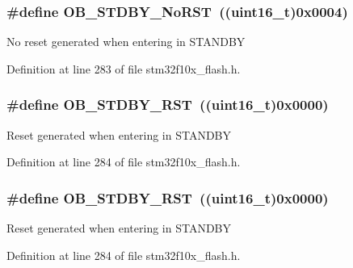 \subsubsection[{\texorpdfstring{O\+B\+\_\+\+S\+T\+D\+B\+Y\+\_\+\+No\+R\+ST}{OB_STDBY_NoRST}}]{\setlength{\rightskip}{0pt plus 5cm}\#define O\+B\+\_\+\+S\+T\+D\+B\+Y\+\_\+\+No\+R\+ST~(({\bf uint16\+\_\+t})0x0004)}\hypertarget{group___option___bytes__n_r_s_t___s_t_d_b_y_ga9588443b20719498422aeb72b65de839}{}\label{group___option___bytes__n_r_s_t___s_t_d_b_y_ga9588443b20719498422aeb72b65de839}
No reset generated when entering in S\+T\+A\+N\+D\+BY 

Definition at line 283 of file stm32f10x\+\_\+flash.\+h.

\subsubsection[{\texorpdfstring{O\+B\+\_\+\+S\+T\+D\+B\+Y\+\_\+\+R\+ST}{OB_STDBY_RST}}]{\setlength{\rightskip}{0pt plus 5cm}\#define O\+B\+\_\+\+S\+T\+D\+B\+Y\+\_\+\+R\+ST~(({\bf uint16\+\_\+t})0x0000)}\hypertarget{group___option___bytes__n_r_s_t___s_t_d_b_y_ga69451a6f69247528f58735c9c83499ce}{}\label{group___option___bytes__n_r_s_t___s_t_d_b_y_ga69451a6f69247528f58735c9c83499ce}
Reset generated when entering in S\+T\+A\+N\+D\+BY 

Definition at line 284 of file stm32f10x\+\_\+flash.\+h.

\subsubsection[{\texorpdfstring{O\+B\+\_\+\+S\+T\+D\+B\+Y\+\_\+\+R\+ST}{OB_STDBY_RST}}]{\setlength{\rightskip}{0pt plus 5cm}\#define O\+B\+\_\+\+S\+T\+D\+B\+Y\+\_\+\+R\+ST~(({\bf uint16\+\_\+t})0x0000)}\hypertarget{group___option___bytes__n_r_s_t___s_t_d_b_y_ga69451a6f69247528f58735c9c83499ce}{}\label{group___option___bytes__n_r_s_t___s_t_d_b_y_ga69451a6f69247528f58735c9c83499ce}
Reset generated when entering in S\+T\+A\+N\+D\+BY 

Definition at line 284 of file stm32f10x\+\_\+flash.\+h.

